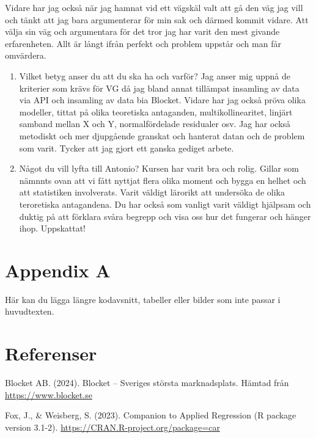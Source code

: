 \documentclass[
  letterpaper,
  DIV=11,
  numbers=noendperiod]{scrreprt}
\begin{document}
Vidare har jag också när jag hamnat vid ett vägskäl valt att gå den väg
jag vill och tänkt att jag bara argumenterar för min sak och därmed
kommit vidare. Att välja sin väg och argumentara för det tror jag har
varit den mest givande erfarenheten. Allt är långt ifrån perfekt och
problem uppstår och man får omvärdera.

\begin{enumerate}
\def\labelenumi{\arabic{enumi}.}
\setcounter{enumi}{2}
\item
  Vilket betyg anser du att du ska ha och varför? Jag anser mig uppnå de
  kriterier som krävs för VG då jag bland annat tillämpat insamling av
  data via API och insamling av data bia Blocket. Vidare har jag också
  pröva olika modeller, tittat på olika teoretiska antaganden,
  multikollinearitet, linjärt samband mellan X och Y, normalfördelade
  residualer osv. Jag har också metodiskt och mer djupgående granskat
  och hanterat datan och de problem som varit. Tycker att jag gjort ett
  ganska gediget arbete.
\item
  Något du vill lyfta till Antonio? Kursen har varit bra och rolig.
  Gillar som nämnnts ovan att vi fått nyttjat flera olika moment och
  bygga en helhet och att statistiken involverats. Varit väldigt
  lärorikt att undersöka de olika teroretiska antagandena. Du har också
  som vanligt varit väldigt hjälpsam och duktig på att förklara svåra
  begrepp och visa oss hur det fungerar och hänger ihop. Uppskattat!
\end{enumerate}


\chapter{Appendix A}\label{appendix-a}

Här kan du lägga längre kodavsnitt, tabeller eller bilder som inte
passar i huvudtexten.


\chapter{Referenser}\label{referenser}

Blocket AB. (2024). Blocket -- Sveriges största marknadsplats. Hämtad
från \url{https://www.blocket.se}

Fox, J., \& Weisberg, S. (2023). Companion to Applied Regression (R
package version 3.1-2). \url{https://CRAN.R-project.org/package=car}
\end{document}
